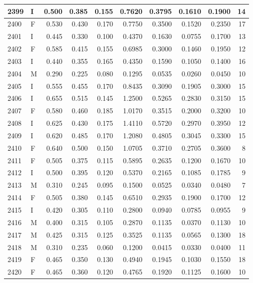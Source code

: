 \documentclass[9pt,twocolumn,twoside,]{pnas-new}
\begin{document}
\begin{tabular}{l|l|r|r|r|r|r|r|r|r}
\hline
2399 & I & 0.500 & 0.385 & 0.155 & 0.7620 & 0.3795 & 0.1610 & 0.1900 & 14\\
\hline
2400 & F & 0.530 & 0.430 & 0.170 & 0.7750 & 0.3500 & 0.1520 & 0.2350 & 17\\
\hline
2401 & I & 0.445 & 0.330 & 0.100 & 0.4370 & 0.1630 & 0.0755 & 0.1700 & 13\\
\hline
2402 & F & 0.585 & 0.415 & 0.155 & 0.6985 & 0.3000 & 0.1460 & 0.1950 & 12\\
\hline
2403 & I & 0.440 & 0.355 & 0.165 & 0.4350 & 0.1590 & 0.1050 & 0.1400 & 16\\
\hline
2404 & M & 0.290 & 0.225 & 0.080 & 0.1295 & 0.0535 & 0.0260 & 0.0450 & 10\\
\hline
2405 & I & 0.555 & 0.455 & 0.170 & 0.8435 & 0.3090 & 0.1905 & 0.3000 & 15\\
\hline
2406 & I & 0.655 & 0.515 & 0.145 & 1.2500 & 0.5265 & 0.2830 & 0.3150 & 15\\
\hline
2407 & F & 0.580 & 0.460 & 0.185 & 1.0170 & 0.3515 & 0.2000 & 0.3200 & 10\\
\hline
2408 & I & 0.625 & 0.430 & 0.175 & 1.4110 & 0.5720 & 0.2970 & 0.3950 & 12\\
\hline
2409 & I & 0.620 & 0.485 & 0.170 & 1.2080 & 0.4805 & 0.3045 & 0.3300 & 15\\
\hline
2410 & F & 0.640 & 0.500 & 0.150 & 1.0705 & 0.3710 & 0.2705 & 0.3600 & 8\\
\hline
2411 & F & 0.505 & 0.375 & 0.115 & 0.5895 & 0.2635 & 0.1200 & 0.1670 & 10\\
\hline
2412 & I & 0.500 & 0.395 & 0.120 & 0.5370 & 0.2165 & 0.1085 & 0.1785 & 9\\
\hline
2413 & M & 0.310 & 0.245 & 0.095 & 0.1500 & 0.0525 & 0.0340 & 0.0480 & 7\\
\hline
2414 & F & 0.505 & 0.380 & 0.145 & 0.6510 & 0.2935 & 0.1900 & 0.1700 & 12\\
\hline
2415 & I & 0.420 & 0.305 & 0.110 & 0.2800 & 0.0940 & 0.0785 & 0.0955 & 9\\
\hline
2416 & M & 0.400 & 0.315 & 0.105 & 0.2870 & 0.1135 & 0.0370 & 0.1130 & 10\\
\hline
2417 & M & 0.425 & 0.315 & 0.125 & 0.3525 & 0.1135 & 0.0565 & 0.1300 & 18\\
\hline
2418 & M & 0.310 & 0.235 & 0.060 & 0.1200 & 0.0415 & 0.0330 & 0.0400 & 11\\
\hline
2419 & F & 0.465 & 0.350 & 0.130 & 0.4940 & 0.1945 & 0.1030 & 0.1550 & 18\\
\hline
2420 & F & 0.465 & 0.360 & 0.120 & 0.4765 & 0.1920 & 0.1125 & 0.1600 & 10\\

\end{tabular}
\end{document}
